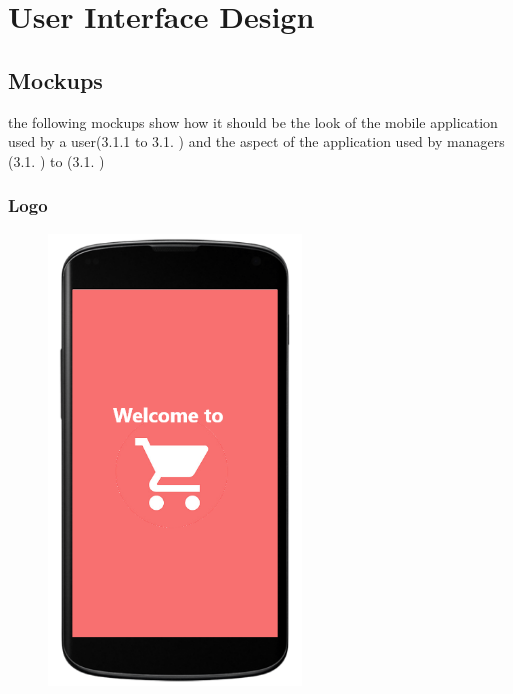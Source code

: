 \section{User Interface Design}
\subsection{Mockups}
the following mockups show how it should be the look of the mobile application used by a user(3.1.1 to 3.1. ) and the aspect of the application used by managers (3.1. ) to (3.1. )
\subsubsection{Logo}
\begin{figure}[H]
  \centering
  \includegraphics[width=0.6\textwidth,keepaspectratio]{images/2.png}
\end{figure}

